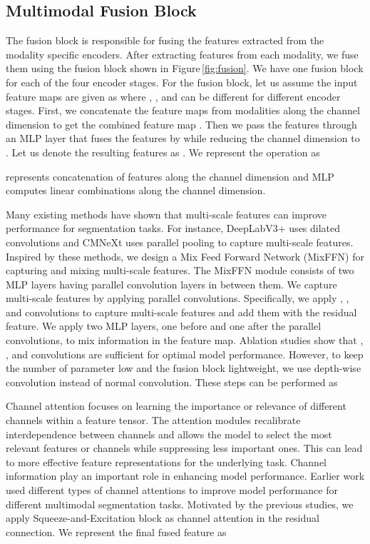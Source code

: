 \documentclass{article}
\begin{document}
\subsection{Multimodal Fusion Block}
The fusion block is responsible for fusing the features extracted from the modality specific encoders. After extracting features  from each modality, we fuse them using the fusion block shown in Figure\,\ref{fig:fusion}. We have one fusion block for each of the four encoder stages. For the  fusion block, let us assume the input feature maps are given as  where , , and  can be different for different encoder stages. First, we concatenate the feature maps from  modalities along the channel dimension to get the combined feature map . Then we pass the features through an MLP layer that fuses the features by while reducing the channel dimension to . Let us denote the resulting features as . We represent the operation as 

 represents concatenation of features along the channel dimension and MLP computes linear combinations along the channel dimension. 

Many existing methods have shown that multi-scale features can improve performance for segmentation tasks. For instance, DeepLabV3+ \cite{chen2018deeplabv3+} uses dilated convolutions and CMNeXt \cite{zhang2023CMNext} uses parallel pooling to capture multi-scale features. Inspired by these methods, we design a Mix Feed Forward Network (MixFFN) for capturing and mixing multi-scale features. The MixFFN module consists of two MLP layers having parallel convolution layers in between them. We capture multi-scale features by applying parallel convolutions. Specifically, we apply , , and  convolutions to capture multi-scale features and add them with the residual feature. We apply two MLP layers, one before and one after the parallel convolutions, to mix information in the feature map. Ablation studies show that , , and   convolutions are sufficient for optimal model performance. However, to keep the number of parameter low and the fusion block lightweight, we use depth-wise convolution instead of normal convolution. These steps can be performed as 



Channel attention focuses on learning the importance or relevance of different channels within a feature tensor. The attention modules recalibrate  interdependence between channels and allows the model to select the most relevant features or channels while suppressing less important ones. This can lead to more effective feature representations for the underlying task. Channel information play an important role in enhancing model performance. Earlier work \cite{hu2019acnet, chen2020sa-gate, zhang2023cmx}  used different types of channel attentions to improve model performance for different multimodal segmentation tasks. Motivated by the previous studies, we apply Squeeze-and-Excitation block \cite{hu2019squeezeandexcitation} as channel attention in the residual connection.
We represent the final fused feature as 
\end{document}
